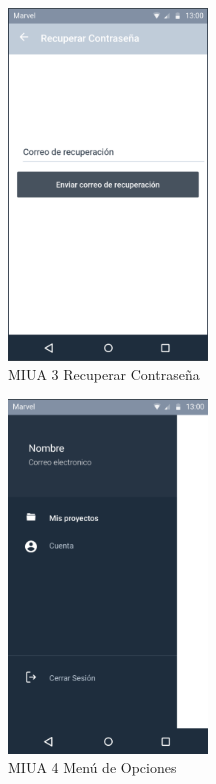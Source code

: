 \newpage
\begin{figure}[h]
    \centering
    \includegraphics[width=200px]{capitulo4/imagenes/android/MIUA_3.png}
    \caption{MIUA 3 Recuperar Contraseña}
    \label{fig:MIUA-3} %
\end{figure}
\newpage
\begin{figure}[h]
    \centering
    \includegraphics[width=200px]{capitulo4/imagenes/android/MIUA_4.png}
    \caption{MIUA 4 Menú de Opciones}
    \label{fig:MIUA-4} %
\end{figure}
\newpage
